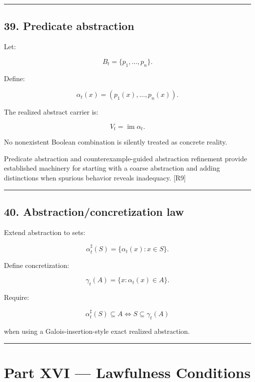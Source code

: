 \documentclass[
]{article}
\begin{document}
\begin{center}\rule{0.5\linewidth}{0.5pt}\end{center}

\subsection{39. Predicate abstraction}\label{predicate-abstraction}

Let:

\[
B_t=\{p_1,\ldots,p_n\}.
\]

Define:

\[
\boxed{
\alpha_t(x)
=
(p_1(x),\ldots,p_n(x)).
}
\]

The realized abstract carrier is:

\[
\boxed{
V_t
=
\operatorname{im}\alpha_t.
}
\]

No nonexistent Boolean combination is silently treated as concrete
reality.

Predicate abstraction and counterexample-guided abstraction refinement
provide established machinery for starting with a coarse abstraction and
adding distinctions when spurious behavior reveals inadequacy. {[}R9{]}

\begin{center}\rule{0.5\linewidth}{0.5pt}\end{center}

\subsection{40. Abstraction/concretization
law}\label{abstractionconcretization-law}

Extend abstraction to sets:

\[
\alpha_t^\sharp(S)
=
\{\alpha_t(x):x\in S\}.
\]

Define concretization:

\[
\gamma_t(A)
=
\{x:\alpha_t(x)\in A\}.
\]

Require:

\[
\boxed{
\alpha_t^\sharp(S)\subseteq A
\iff
S\subseteq\gamma_t(A)
}
\]

when using a Galois-insertion-style exact realized abstraction.

\begin{center}\rule{0.5\linewidth}{0.5pt}\end{center}

\section{Part XVI --- Lawfulness
Conditions}\label{part-xvi-lawfulness-conditions}
\end{document}

